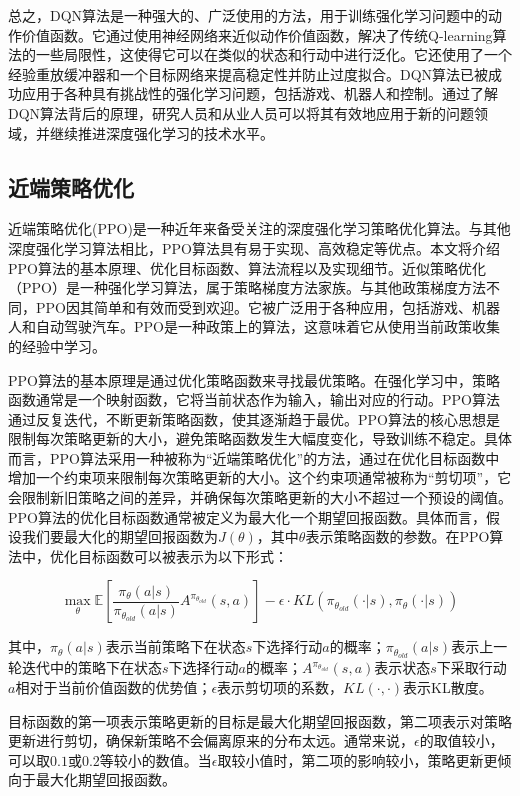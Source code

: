 总之，DQN算法是一种强大的、广泛使用的方法，用于训练强化学习问题中的动作价值函数。它通过使用神经网络来近似动作价值函数，解决了传统Q-learning算法的一些局限性，这使得它可以在类似的状态和行动中进行泛化。它还使用了一个经验重放缓冲器和一个目标网络来提高稳定性并防止过度拟合。DQN算法已被成功应用于各种具有挑战性的强化学习问题，包括游戏、机器人和控制。通过了解DQN算法背后的原理，研究人员和从业人员可以将其有效地应用于新的问题领域，并继续推进深度强化学习的技术水平。


\subsection{近端策略优化}

近端策略优化(PPO)是一种近年来备受关注的深度强化学习策略优化算法。与其他深度强化学习算法相比，PPO算法具有易于实现、高效稳定等优点。本文将介绍PPO算法的基本原理、优化目标函数、算法流程以及实现细节。近似策略优化（PPO）是一种强化学习算法，属于策略梯度方法家族。与其他政策梯度方法不同，PPO因其简单和有效而受到欢迎。它被广泛用于各种应用，包括游戏、机器人和自动驾驶汽车。PPO是一种政策上的算法，这意味着它从使用当前政策收集的经验中学习。

PPO算法的基本原理是通过优化策略函数来寻找最优策略。在强化学习中，策略函数通常是一个映射函数，它将当前状态作为输入，输出对应的行动。PPO算法通过反复迭代，不断更新策略函数，使其逐渐趋于最优。PPO算法的核心思想是限制每次策略更新的大小，避免策略函数发生大幅度变化，导致训练不稳定。具体而言，PPO算法采用一种被称为“近端策略优化”的方法，通过在优化目标函数中增加一个约束项来限制每次策略更新的大小。这个约束项通常被称为“剪切项”，它会限制新旧策略之间的差异，并确保每次策略更新的大小不超过一个预设的阈值。PPO算法的优化目标函数通常被定义为最大化一个期望回报函数。具体而言，假设我们要最大化的期望回报函数为$J(\theta)$，其中$\theta$表示策略函数的参数。在PPO算法中，优化目标函数可以被表示为以下形式：

$$\max_{\theta}\mathbb{E}\left[\frac{\pi_{\theta}(a|s)}{\pi_{\theta_{old}}(a|s)}A^{\pi_{\theta_{old}}}(s,a)\right]-\epsilon\cdot KL\left(\pi_{\theta_{old}}(\cdot|s),\pi_{\theta}(\cdot|s)\right)$$

其中，$\pi_{\theta}(a|s)$表示当前策略下在状态$s$下选择行动$a$的概率；$\pi_{\theta_{old}}(a|s)$表示上一轮迭代中的策略下在状态$s$下选择行动$a$的概率；$A^{\pi_{\theta_{old}}}(s,a)$表示状态$s$下采取行动$a$相对于当前价值函数的优势值；$\epsilon$表示剪切项的系数，$KL(\cdot,\cdot)$表示KL散度。

目标函数的第一项表示策略更新的目标是最大化期望回报函数，第二项表示对策略更新进行剪切，确保新策略不会偏离原来的分布太远。通常来说，$\epsilon$的取值较小，可以取$0.1$或$0.2$等较小的数值。当$\epsilon$取较小值时，第二项的影响较小，策略更新更倾向于最大化期望回报函数。

